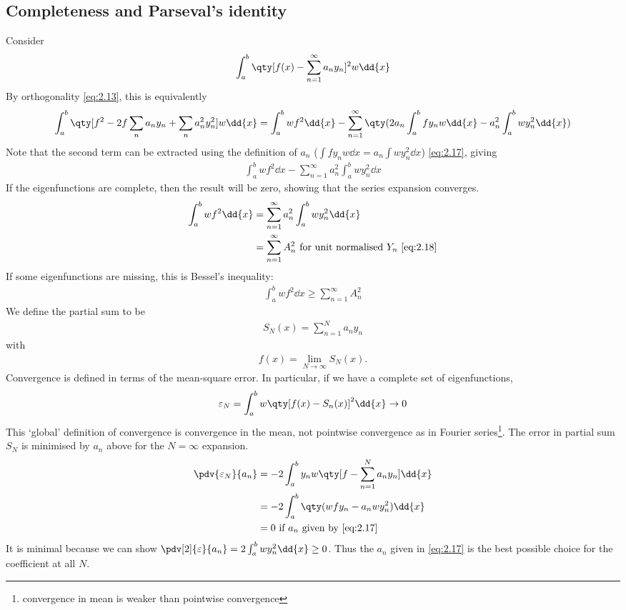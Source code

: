\subsection{Completeness and Parseval's identity}
Consider
\begin{align*}
    \int_a^b \qty[ f(x) - \sum_{n=1}^\infty a_n y_n ]^2 w \dd{x}
\end{align*}
By orthogonality \cref{eq:2.13}, this is equivalently
\begin{align*}
    \int_a^b \qty[ f^2 - 2 f \sum_n a_n y_n + \sum_n a_n^2 y_n^2 ] w \dd{x} = \int_a^b wf^2 \dd{x} - \sum_{n=1}^{\infty} \qty( 2 a_n \int_a^b f y_n w \dd{x} - a_n^2 \int_a^b w y_n^2 \dd{x} )
\end{align*}
Note that the second term can be extracted using the definition of $a_n$ ($\int f y_n w \dd{x} = a_n \int w y_n^2 \dd{x}$) \cref{eq:2.17}, giving
\begin{align*}
    \int_a^b wf^2 \dd{x} - \sum_{n=1}^\infty a_n^2 \int_a^b w y_n^2 \dd{x}
\end{align*}
If the eigenfunctions are complete, then the result will be zero, showing that the series expansion converges.
\begin{align}
    \int_a^b w f^2 \dd{x} &= \sum_{n=1}^\infty a_n^2 \int_a^b w y_n^2 \dd{x} \label{eq:2.19} \\
    &= \sum_{n=1}^\infty A_n^2 \text{ for unit normalised } Y_n \ \cref{eq:2.18} \notag
\end{align}
If some eigenfunctions are missing, this is Bessel's inequality:
\begin{align*}
    \int_a^b w f^2 \dd{x} \geq \sum_{n=1}^\infty A_n^2
\end{align*}
We define the partial sum to be
\begin{align*}
    S_N(x) = \sum_{n=1}^N a_n y_n
\end{align*}
with 
\begin{align}
    f(x) = \lim_{N \to \infty} S_N(x) \label{eq:2.20}.
\end{align}
Convergence is defined in terms of the mean-square error.
In particular, if we have a complete set of eigenfunctions,
\begin{align*}
    \varepsilon_N = \int_a^b w \qty[f(x) - S_n(x)]^2 \dd{x} \to 0
\end{align*}
This `global' definition of convergence is convergence in the mean, not pointwise convergence as in Fourier series\footnote{convergence in mean is weaker than pointwise convergence}.
The error in partial sum $S_N$ is minimised by $a_n$ above for the $N = \infty$ expansion.
\begin{align*}
    \pdv{\varepsilon_N}{a_n} &= -2 \int_a^b y_n w \qty[ f - \sum_{n=1}^N a_n y_n ] \dd{x} \\
    &= -2 \int_a^b \qty(wfy_n - a_n w y_n^2) \dd{x} \\
    &= 0 \text{ if $a_n$ given by \cref{eq:2.17}}
\end{align*}
It is minimal because we can show $\pdv[2]{\varepsilon}{a_n} = 2 \int_a^b w y_n^2 \dd{x} \geq 0$.
Thus the $a_n$ given in \cref{eq:2.17} is the best possible choice for the coefficient at all $N$.

